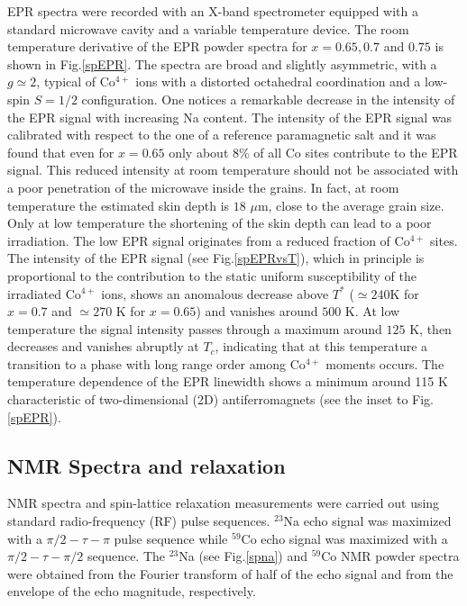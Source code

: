 \documentclass[prb,showpacs,preprintnumbers,amsmath,amssymb,floatfix]{revtex4}
\begin{document}
EPR spectra were recorded with an X-band spectrometer equipped
with a standard microwave cavity and a variable temperature
device. The room temperature derivative of the EPR powder spectra
for $x=0.65, 0.7$ and $0.75$ is shown in Fig.\ref{spEPR}. The
spectra are broad and slightly asymmetric, with a $g\simeq 2$,
typical of Co$^{4+}$ ions with a distorted octahedral coordination
and a low-spin $S=1/2$ configuration. One notices a remarkable
decrease in the intensity of the EPR signal with increasing Na
content. The intensity of the EPR signal was calibrated with
respect to the one of a reference paramagnetic salt and it was
found that even for $x=0.65$ only about $8$\% of all Co sites
contribute to the EPR signal. This reduced intensity at room
temperature should not be associated with a poor penetration of
the microwave inside the grains. In fact, at room temperature the
estimated skin depth is $18$ $\mu$m, close to the average grain
size. Only at low temperature the shortening of the skin depth can
lead to a poor irradiation. The low EPR signal originates from a
reduced fraction of Co$^{4+}$ sites. The intensity of the EPR
signal (see Fig.\ref{spEPRvsT}), which in principle is
proportional to the contribution  to the static uniform
susceptibility of the irradiated Co$^{4+}$ ions, shows an
anomalous decrease above $T^*$ ($\simeq 240$K for $x=0.7$ and
$\simeq 270$ K for $x=0.65$) and vanishes around $500$ K. At low
temperature the signal intensity passes through a maximum around
$125$ K, then decreases and vanishes abruptly at $T_c$, indicating
that at this temperature a transition to a phase with long range
order among Co$^{4+}$ moments occurs. The temperature dependence
of the EPR linewidth shows a minimum around 115 K characteristic
of two-dimensional (2D) antiferromagnets \cite{Richards,MnCl2}
(see the inset to Fig.\ref{spEPR}).





\subsection{NMR Spectra and relaxation}

NMR spectra and spin-lattice relaxation measurements were carried
out using standard radio-frequency (RF) pulse sequences. $^{23}$Na
echo signal was maximized with a $\pi/2 -\tau - \pi$ pulse
sequence while $^{59}$Co echo signal was maximized with a $\pi/2
-\tau -\pi/2$ sequence. The $^{23}$Na (see Fig.\ref{spna}) and
$^{59}$Co NMR powder spectra were obtained from the Fourier
transform of half of the echo signal and from the envelope of the
echo magnitude, respectively.
\end{document}
